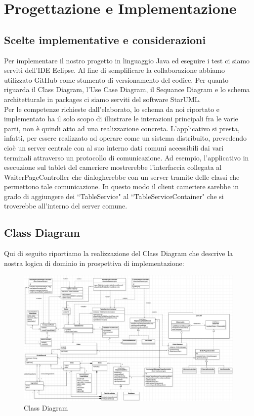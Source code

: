 \documentclass{article}
\begin{document}
\section{Progettazione e Implementazione}
\subsection{Scelte implementative e considerazioni}
Per implementare il nostro progetto in linguaggio Java ed eseguire i test ci siamo serviti dell'IDE Eclipse. Al fine di semplificare la collaborazione abbiamo utilizzato GitHub come stumento di versionamento del codice. Per quanto riguarda il Class Diagram, l'Use Case Diagram, il Sequance Diagram e lo schema architetturale in packages ci siamo serviti del software StarUML. \\
Per le competenze richieste dall'elaborato, lo schema da noi riportato e implementato ha il solo scopo di illustrare le interazioni principali fra le varie parti, non \`e quindi atto ad una realizzazione concreta. L'applicativo si presta, infatti, per essere realizzato ad operare come un sistema distribuito, prevedendo cio\`e un server centrale con al suo interno dati comuni accessibili dai vari terminali attraverso un protocollo di comunicazione.
Ad esempio, l'applicativo in esecuzione sul tablet del cameriere mostrerebbe l'interfaccia collegata al WaiterPageController che dialogherebbe con un server tramite delle classi che permettono tale comunicazione. In questo modo il client cameriere sarebbe in grado di aggiungere dei ``TableService" al ``TableServiceContainer" che si troverebbe all'interno del server comune.  

\newpage

\subsection{Class Diagram}
Qui di seguito riportiamo la realizzazione del Class Diagram che descrive la nostra logica di dominio in prospettiva di implementazione:

\begin{figure}[!h]
\centering
\includegraphics[width= 15cm]{"Immagini/ClassDiagram.PNG"}
\caption{Class Diagram}
\label{ClassDiagram}
\end{figure}
\end{document}

